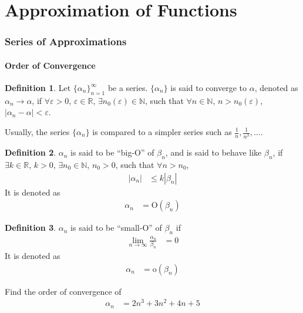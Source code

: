 \documentclass[fleqn, a4paper, 12pt, twoside, titlepage]{article}
\theoremstyle{definition}
\newtheorem{definition}{Definition}
\theoremstyle{theorem}
\begin{document}
\newpage
\part{Approximation of Functions}

\section{Series of Approximations}

\subsection{Order of Convergence}

\begin{definition}
	Let $\{\alpha_n\}_{n = 1}^{\infty}$ be a series.
	$\{\alpha_n\}$ is said to converge to $\alpha$, denoted as $\alpha_n \to \alpha$, if $\forall \varepsilon > 0$, $\varepsilon \in \mathbb{R}$, $\exists n_0(\varepsilon) \in \mathbb{N}$, such that $\forall n \in \mathbb{N}$, $n > n_0(\varepsilon)$, $|\alpha_n - \alpha| < \varepsilon$.
\end{definition}

Usually, the series $\{\alpha_n\}$ is compared to a simpler series such as $\frac{1}{n} , \frac{1}{n^{\beta}} , \dots$.

\begin{definition}
	$\alpha_n$ is said to be ``big-O'' of $\beta_n$, and is said to behave like $\beta_n$, if $\exists k \in \mathbb{R}$, $k > 0$, $\exists n_0 \in \mathbb{N}$, $n_0 > 0$, such that $\forall n > n_0$,
	\begin{align*}
		|\alpha_n| &\le k |\beta_n|
	\end{align*}
	It is denoted as
	\begin{align*}
		\alpha_n &= \mathrm{O}(\beta_n)
	\end{align*}
\end{definition}

\begin{definition}
	$\alpha_n$ is said to be ``small-O'' of $\beta_n$ if
	\begin{align*}
		\lim\limits_{n \to \infty} \frac{\alpha_n}{\beta_n} &= 0
	\end{align*}
	It is denoted as
	\begin{align*}
		\alpha_n &= \mathrm{o}(\beta_n)
	\end{align*}
\end{definition}

\begin{question}
	Find the order of convergence of
	\begin{align*}
		\alpha_n &= 2 n^3 + 3 n^2 + 4 n + 5
	\end{align*}
\end{question}
\end{document}
